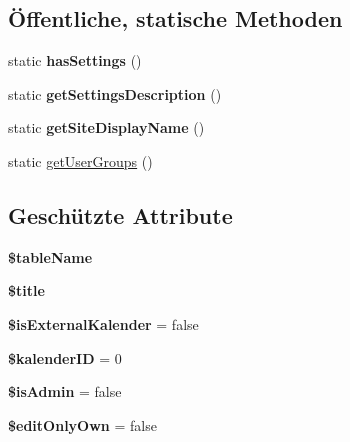 \subsection*{Öffentliche, statische Methoden}
\begin{DoxyCompactItemize}
\item 
\mbox{\label{class_abstract_kalender_page_a8cedfe3054b3a64918b20d773ab1653f}} 
static {\bfseries has\+Settings} ()
\item 
\mbox{\label{class_abstract_kalender_page_a8c9d4c6d8fd431fb8ef093bd61ee696f}} 
static {\bfseries get\+Settings\+Description} ()
\item 
\mbox{\label{class_abstract_kalender_page_a1bcc711b4183ee1e845dbfd4d8372477}} 
static {\bfseries get\+Site\+Display\+Name} ()
\item 
static \mbox{\hyperlink{class_abstract_kalender_page_aa13b71bde8552e68ad01019cb3c8ae73}{get\+User\+Groups}} ()
\end{DoxyCompactItemize}
\subsection*{Geschützte Attribute}
\begin{DoxyCompactItemize}
\item 
\mbox{\label{class_abstract_kalender_page_a5e528ab8c173c052fa15ff719fc3bc35}} 
{\bfseries \$table\+Name}
\item 
\mbox{\label{class_abstract_kalender_page_a3444bf0feb9603ea944bdc7183330a3e}} 
{\bfseries \$title}
\item 
\mbox{\label{class_abstract_kalender_page_ad67e3c33685f2cba865af6dac560bcaa}} 
{\bfseries \$is\+External\+Kalender} = false
\item 
\mbox{\label{class_abstract_kalender_page_a6cac7834306f762c697aeb6fa6a187d1}} 
{\bfseries \$kalender\+ID} = 0
\item 
\mbox{\label{class_abstract_kalender_page_a5991e269dfc789b53aa9fd9ece247d9c}} 
{\bfseries \$is\+Admin} = false
\item 
\mbox{\label{class_abstract_kalender_page_a760cbe0bbb90ed071df2e1c5b3205c8e}} 
{\bfseries \$edit\+Only\+Own} = false
\end{DoxyCompactItemize}

